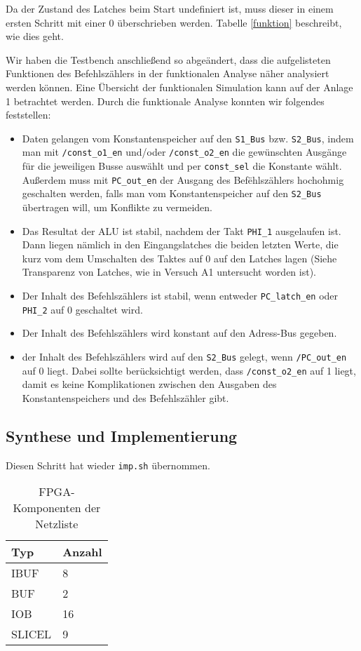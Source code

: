 \documentclass[12pt,a4paper]{scrartcl}
\begin{document}
Da der Zustand des Latches beim Start undefiniert ist, muss dieser in einem ersten Schritt mit einer 0 \"uberschrieben werden.
Tabelle \ref{funktion} beschreibt, wie dies geht.

Wir haben die Testbench anschlie\ss end so abge\"andert, dass die aufgelisteten Funktionen des Befehlsz\"ahlers in der funktionalen Analyse n\"aher analysiert werden k\"onnen. Eine \"Ubersicht der funktionalen Simulation kann auf der Anlage 1 betrachtet werden. Durch die funktionale Analyse konnten wir folgendes feststellen:

\begin{itemize}
  \item Daten gelangen vom Konstantenspeicher auf den \texttt{S1\_Bus} bzw. \texttt{S2\_Bus}, indem man mit \texttt{/const\_o1\_en} und/oder \texttt{/const\_o2\_en} die gew\"unschten Ausg\"ange f\"ur die jeweiligen Busse ausw\"ahlt und per \texttt{const\_sel} die Konstante w\"ahlt. Au\ss erdem muss mit \texttt{PC\_out\_en} der Ausgang des Bef\"ehlsz\"ahlers hochohmig geschalten werden, falls man vom Konstantenspeicher auf den \texttt{S2\_Bus} \"ubertragen will, um Konflikte zu vermeiden.
  \item Das Resultat der ALU ist stabil, nachdem der Takt \texttt{PHI\_1} ausgelaufen ist. Dann liegen n\"amlich in den Eingangslatches die beiden letzten Werte, die kurz vom dem Umschalten des Taktes auf 0 auf den Latches lagen (Siehe Transparenz von Latches, wie in Versuch A1 untersucht worden ist).
  \item Der Inhalt des Befehlsz\"ahlers ist stabil, wenn entweder \texttt{PC\_latch\_en} oder \texttt{PHI\_2} auf 0 geschaltet wird.
  \item Der Inhalt des Befehlsz\"ahlers wird konstant auf den Adress-Bus gegeben.
  \item der Inhalt des Befehlsz\"ahlers wird auf den \texttt{S2\_Bus} gelegt, wenn \texttt{/PC\_out\_en} auf 0 liegt. Dabei sollte ber\"ucksichtigt werden, dass \texttt{/const\_o2\_en} auf 1 liegt, damit es keine Komplikationen zwischen den Ausgaben des Konstantenspeichers und des Befehlsz\"ahler gibt.
\end{itemize}


\subsection{Synthese und Implementierung}
Diesen Schritt hat wieder \texttt{imp.sh} \"ubernommen.

\begin{table}[h]
    \centering
    \begin{tabular}{l|l}
    \hline
    Typ     & Anzahl  \\
    \hline
    IBUF    & 8       \\ %
    BUF     & 2       \\ %
    IOB     & 16      \\ %
    SLICEL  & 9       \\
    \hline
    \end{tabular}
    \caption{FPGA-Komponenten der Netzliste}
    \label{netzliste}
\end{table}
\end{document}
